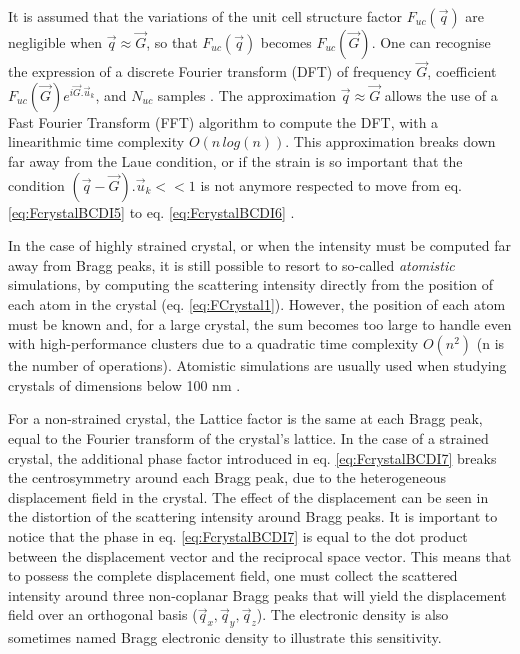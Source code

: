 It is assumed that the variations of the unit cell structure factor $F_{uc}(\vec{q})$ are negligible when $\vec{q} \approx \vec{G}$, so that $F_{uc}(\vec{q})$ becomes $F_{uc}(\vec{G})$.
One can recognise the expression of a discrete Fourier transform (DFT) of frequency $\vec{G}$, coefficient $F_{uc}(\vec{G}) e^{i\vec{G}.\vec{u}_k}$, and $N_{uc}$ samples \parencite{Cooley1965, Cochran1967, FavreNicolin2011a, Godard2021}.
The approximation $\vec{q} \approx \vec{G}$ allows the use of a Fast Fourier Transform (FFT) algorithm to compute the DFT, with a linearithmic time complexity $O(n \, log(n))$.
This approximation breaks down far away from the Laue condition, or if the strain is so important that the condition $(\vec{q}-\vec{G}).\vec{u}_k<<1$ is not anymore respected to move from eq. \ref{eq:FcrystalBCDI5} to eq. \ref{eq:FcrystalBCDI6} \parencite{Takagi1969}.

In the case of highly strained crystal, or when the intensity must be computed far away from Bragg peaks, it is still possible to resort to so-called \textit{atomistic} simulations, by computing the scattering intensity directly from the position of each atom in the crystal (eq. \ref{eq:FCrystal1}).
However, the position of each atom must be known and, for a large crystal, the sum becomes too large to handle even with high-performance clusters due to a quadratic time complexity $O(n^2)$ (n is the number of operations).
Atomistic simulations are usually used when studying crystals of dimensions below 100 nm \parencite{Dupraz2022}.

For a non-strained crystal, the Lattice factor is the same at each Bragg peak, equal to the Fourier transform of the crystal's lattice.
In the case of a strained crystal, the additional phase factor introduced in eq. \ref{eq:FcrystalBCDI7} breaks the centrosymmetry around each Bragg peak, due to the heterogeneous displacement field in the crystal.
The effect of the displacement can be seen in the distortion of the scattering intensity around Bragg peaks.
It is important to notice that the phase in eq. \ref{eq:FcrystalBCDI7} is equal to the dot product between the displacement vector and the reciprocal space vector.
This means that to possess the complete displacement field, one must collect the scattered intensity around three non-coplanar Bragg peaks \parencite{Newton2010} that will yield the displacement field over an orthogonal basis ($\vec{q}_x, \vec{q}_y, \vec{q}_z$).
The electronic density is also sometimes named Bragg electronic density to illustrate this sensitivity.

